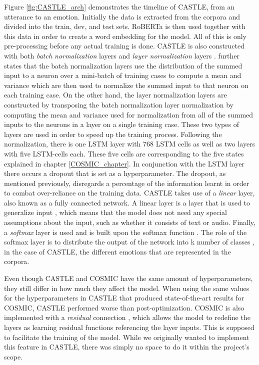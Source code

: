 \documentclass[nofilelist]{cslthse-msc}
\begin{document}
Figure \ref{fig:CASTLE_arch} demonstrates the timeline of CASTLE, from an utterance to an emotion. Initially the data is extracted from the corpora and divided into the train, dev, and test sets. RoBERTa is then used together with this data in order to create a word embedding for the model. All of this is only pre-processing before any actual training is done. 
CASTLE is also constructed with both \textit{batch normalization} layers \citep{ioffe2015batch} and \textit{layer normalization} layers \citep{Ba2016LayerN}. \citet{Ba2016LayerN} further states that the batch normalization layers use the distribution of the summed input to a neuron over a mini-batch of training cases to compute a mean and variance which are then used to normalize the summed input to that neuron on each training case. On the other hand, the layer normalization layers are constructed by transposing the batch normalization layer normalization by computing the mean and variance used for normalization from all of the summed inputs to the neurons in a layer on a single training case. These two types of layers are used in order to speed up the training process. 
Following the normalization, there is one LSTM layer with 768 LSTM cells as well as two layers with five LSTM-cells each. These five cells are corresponding to the five states explained in chapter \ref{COSMIC_chapter}. In conjunction with the LSTM layer there occurs a dropout that is set as a hyperparameter. The dropout, as mentioned previously, disregards a percentage of the information learnt in order to combat over-reliance on the training data. 
CASTLE takes use of a \textit{linear} layer, also known as a fully connected network. A linear layer is a layer that is used to generalize input \citep{TensorflowDeep}, which means that the model does not need any special assumptions about the input, such as whether it consists of text or audio.
Finally, a \textit{softmax} layer is used and is built upon the softmax function \citep{boltzmann1868studien}. The role of the softmax layer is to distribute the output of the network into k number of classes \citep{hess2020softmaxbased}, in the case of CASTLE, the different emotions that are represented in the corpora. 



Even though CASTLE and COSMIC have the same amount of hyperparameters, they still differ in how much they affect the model. When using the same values for the hyperparameters in CASTLE that produced state-of-the-art results for COSMIC, CASTLE performed worse than post-optimization. 
COSMIC is also implemented with a \textit{residual} connection \citep{he2015deep}, which allows the model to redefine the layers as learning residual functions referencing the layer inputs. This is supposed to facilitate the training of the model. While we originally wanted to implement this feature in CASTLE, there was simply no space to do it within the project's scope. 
\end{document}
